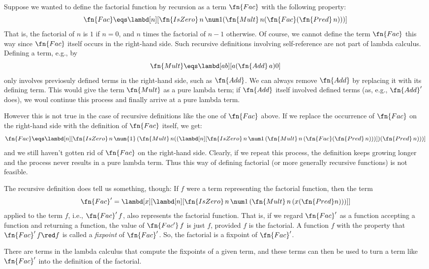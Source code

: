 \documentclass[../../../include/open-logic-section]{subfiles}
\begin{document}


Suppose we wanted to define the factorial function by recursion as a
term $\fn{Fac}$ with the following property:
\[
\fn{Fac} \eqs \lambd[n][\fn{IsZero}\, n\, \num 1 (\fn{Mult}\, n (\fn{Fac}(\fn{Pred} \, n)))]
\]
That is, the factorial of $n$ is $1$ if $n = 0$, and $n$ times the
factorial of $n-1$ otherwise.  Of course, we cannot define the term
$\fn{Fac}$ this way since $\fn{Fac}$ itself occurs in the right-hand
side. Such recursive definitions involving self-reference
are not part of lambda calculus. Defining a term, e.g., by
\[
\fn{Mult} \eqs \lambd[ab][a (\fn{Add}\, a) 0]
\]
only involves previosuly defined terms in the right-hand side, such as
$\fn{Add}$. We can always remove $\fn{Add}$ by replacing it with its
defining term.  This would give the term $\fn{Mult}$ as a pure lambda
term; if $\fn{Add}$ itself involved defined terms (as, e.g.,
$\fn{Add}'$ does), we woul continue this process and finally arrive at
a pure lambda term.

However this is not true in the case of recursive definitions like the
one of $\fn{Fac}$ above. If we replace the occurrence of $\fn{Fac}$ on
the right-hand side with the definition of $\fn{Fac}$ itself, we get:
\[
\fn{Fac} \eqs \lambd[n][\fn{IsZero}\, n\, \num{1}\, (\fn{Mult}\, n
  ((\lambd[n][\fn{IsZero} \, n \, \num 1\, (\fn{Mult}\, n\, (\fn{Fac}
    (\fn{Pred}\, n)))]) (\fn{Pred}\, n)))]
\]
and we still haven't gotten rid of $\fn{Fac}$ on the right-hand
side. Clearly, if we repeat this process, the definition keeps growing
longer and the process never results in a pure lambda term. Thus this
way of defining factorial (or more generally recursive functions)
is not feasible.

The recursive definition does tell us something, though: If $f$ were a
term representing the factorial function, then the term
\[
\fn{Fac}' = \lambd[x][\lambd[n][\fn{IsZero} \, n \, \num 1\, (\fn{Mult} \, n\, (x (\fn{Pred} n)))]]
\]
applied to the term $f$, i.e., $\fn{Fac}'\,f$, also represents the
factorial function.  That is, if we regard $\fn{Fac}'$ as a function
accepting a function and returning a function, the value of
$\fn{Fac'}\, f$ is just $f$, provided $f$ is the factorial. A function
$f$ with the property that $\fn{Fac}' \, f \red f$ is called a
\emph{fixpoint} of $\fn{Fac}'$. So, the factorial is a fixpoint of
$\fn{Fac}'$.

There are terms in the lambda calculus that compute the fixpoints of a
given term, and these terms can then be used to turn a term like
$\fn{Fac}'$ into the definition of the factorial. 
\end{document}
